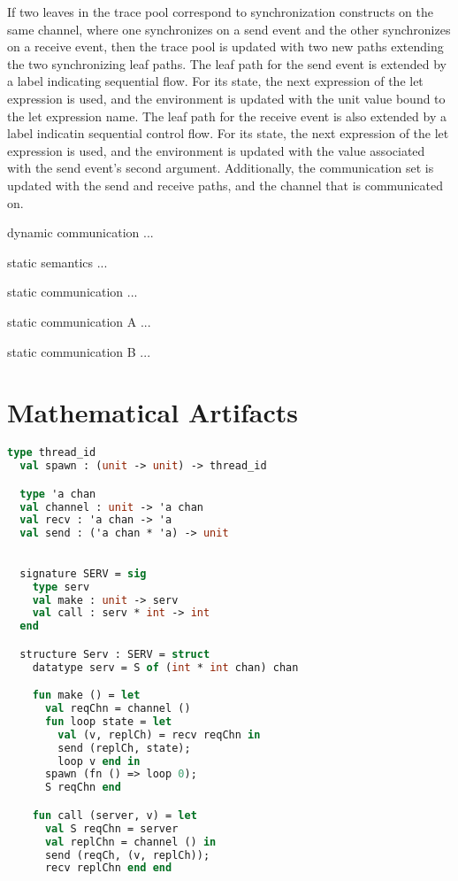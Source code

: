 \documentclass{article}
\begin{document}
If two leaves in the trace pool correspond to synchronization constructs on the same channel, where one synchronizes on a send event
and the other synchronizes on a receive event, then the trace pool is updated with two new paths extending the two synchronizing leaf paths.  The leaf path for the send event is extended by a label indicating sequential flow.  For its state, the next expression of the let expression is used, and the environment is updated with the unit value bound to the let expression name.  The leaf path for the receive event is also extended by a label indicatin sequential control flow.  For its state, the next expression of the let expression is used, and the environment is updated with the value associated with the send event's second argument.   Additionally, the communication set is updated with the send and receive paths, and the channel that is communicated on. 


dynamic communication ...


static semantics ...


static communication ...

static communication A ...


static communication B ...






\section{Mathematical Artifacts}

\begin{lstlisting}[language=ML, style=codestyle1]
  type thread_id
  val spawn : (unit -> unit) -> thread_id

  type 'a chan
  val channel : unit -> 'a chan
  val recv : 'a chan -> 'a
  val send : ('a chan * 'a) -> unit
  \end{lstlisting}

\begin{lstlisting}[language=ML, style=codestyle1]

  signature SERV = sig 
    type serv
    val make : unit -> serv
    val call : serv * int -> int
  end

  structure Serv : SERV = struct 
    datatype serv = S of (int * int chan) chan 

    fun make () = let 
      val reqChn = channel ()
      fun loop state = let
        val (v, replCh) = recv reqChn in 
        send (replCh, state);
        loop v end in
      spawn (fn () => loop 0);
      S reqChn end 

    fun call (server, v) = let 
      val S reqChn = server
      val replChn = channel () in 
      send (reqCh, (v, replCh));
      recv replChn end end

  \end{lstlisting}
\end{document}
